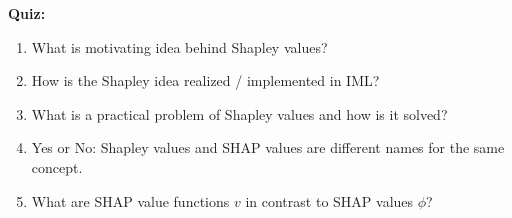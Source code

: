 \textbf{Quiz:}
\begin{enumerate}
    \item What is motivating idea behind Shapley values? 
    \item How is the Shapley idea realized / implemented in IML?
    \item What is a practical problem of Shapley values and how is it solved?
    \item Yes or No: Shapley values and SHAP values are different names for the same concept.
    \item What are SHAP value functions $v$ in contrast to SHAP values $\phi$?
\end{enumerate}
